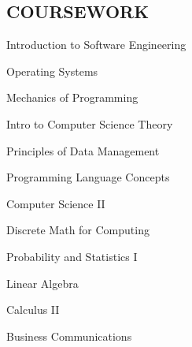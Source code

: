 \documentclass[line, margin]{res}
\begin{document}
\begin{resume}
\section{COURSEWORK}


      \begin{enumerate*}[series=MyList, before=\hspace{-0.6ex}, label=\textbullet]
        \item Introduction to Software Engineering
        \item Operating Systems
        \item Mechanics of Programming
        \item Intro to Computer Science Theory
        \item Principles of Data Management
        \item Programming Language Concepts
        \item Computer Science II
        \item Discrete Math for Computing
        \item Probability and Statistics I
        \item Linear Algebra
        \item Calculus II
        \item Business Communications
      \end{enumerate*}


 
\end{resume}
\end{document}
